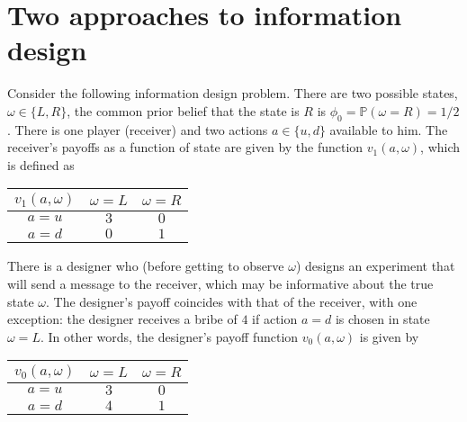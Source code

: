\documentclass[a4paper]{article}
\begin{document}
\section{Two approaches to information design}
	
	Consider the following information design problem. There are two possible states, $\omega \in \{L,R\}$, the common prior belief that the state is $R$ is $\phi_0 = \mathbb{P}(\omega = R) = 1/2$. There is one player (receiver) and two actions $a \in \{u,d\}$ available to him. The receiver's payoffs as a function of state are given by the function $v_1(a,\omega)$, which is defined as
	\begin{center}
		\begin{tabular}{c | c | c |}
			$v_1(a,\omega)$ 		& $\omega = L$ 	& $\omega = R$ \\ \hline
			$a=u$	& $3$ 	& $0$	\\ \hline
			$a=d$	& $0$ 	& $1$	\\ \hline
		\end{tabular}
	\end{center}
	There is a designer who (before getting to observe $\omega$) designs an experiment that will send a message to the receiver, which may be informative about the true state $\omega$. The designer's payoff coincides with that of the receiver, with one exception: the designer receives a bribe of $4$ if action $a=d$ is chosen in state $\omega=L$. In other words, the designer's payoff function $v_0(a,\omega)$ is given by
	\begin{center}
		\begin{tabular}{c | c | c |}
			$v_0(a,\omega)$ 		& $\omega = L$ 	& $\omega = R$ \\ \hline
			$a=u$	& $3$ 	& $0$	\\ \hline
			$a=d$	& $4$ 	& $1$	\\ \hline
		\end{tabular}
	\end{center}
	
\end{document}
